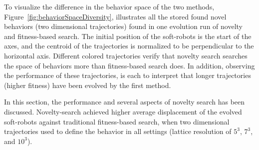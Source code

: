 To visualize the difference in the behavior space of the two methods, Figure~\ref{fig:behaviorSpaceDiversity}, illustrates all the stored found novel behaviors (two dimensional trajectories) found in one evolution run of novelty and fitness-based search. The initial position of the soft-robots is the start of the axes, and the centroid of the trajectories is normalized to be perpendicular to the horizontal axis. Different colored trajectories verify that novelty search searches the space of behaviors more than fitness-based search does. In addition, observing the performance of these trajectories, is each to interpret that longer trajectories (higher fitness) have been evolved by the first method. 

In this section, the performance and several aspects of novelty search has been discussed. Novelty-search achieved higher average displacement of the evolved soft-robots against traditional fitness-based search, when two dimensional trajectories used to define the behavior in all settings (lattice resolution of $5^3$, $7^3$, and $10^3$).


